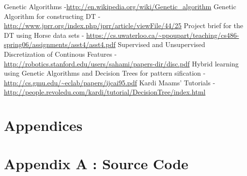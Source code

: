 \documentclass[12pt]{report}
\begin{document}
\begin{thebibliography}{refs}
Genetic Algorithms  -\url{http://en.wikipedia.org/wiki/Genetic_algorithm}
Genetic Algorithm for constructing DT - \url{http://www.jprr.org/index.php/jprr/article/viewFile/44/25}
 Project brief for the DT  using Horse data sets  - \url{https://cs.uwaterloo.ca/~ppoupart/teaching/cs486-spring06/assignments/asst4/asst4.pdf}
Supervised and Unsupervised Discretization of Continous Features - \url{http://robotics.stanford.edu/users/sahami/papers-dir/disc.pdf}
Hybrid learning using Genetic Algorithms and Decision Trees for pattern sification - \url{http://cs.gmu.edu/~eclab/papers/ijcai95.pdf}
Kardi Maams' Tutorials - \url{http://people.revoledu.com/kardi/tutorial/DecisionTree/index.html}

\end{thebibliography}

\newpage
\pagestyle{fancy}
\chead{}
\rfoot{\small{\thepage}}
\renewcommand{\headrulewidth}{0.4pt}
\renewcommand{\footrulewidth}{0.4pt}

\section*{Appendices}
\section*{Appendix A : Source Code}






\end{document}
